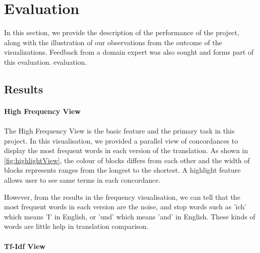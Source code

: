 \clearpage
\section{Evaluation}
In this section, we provide the description of the performance of the project, along with the illustration of our observations from the outcome of the visualizations. Feedback from a domain expert was also sought and forms part of this evaluation. evaluation.

\subsection{Results}

\paragraph{High Frequency View}
\paragraph[]{}
The High Frequency View is the basic feature and the primary task in this project. In this visualisation, we provided a parallel view of concordances to display the most frequent words in each version of the translation. As shown in \ref{fig:highlightView}, the colour of blocks differs from each other and the width of blocks represents ranges from the longest to the shortest. A highlight feature allows user to see same terms in each concordance.

However, from the results in the frequency visualisation, we can tell that the most frequent words in each version are the noise, and stop words such as 'ich' which means 'I' in English, or 'und' which means 'and' in English. These kinds of words are little help in translation comparison.


\paragraph{Tf-Idf View}
